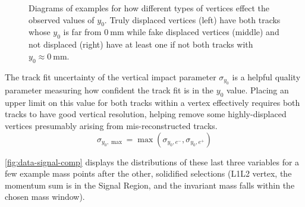 \begin{figure}
  \begin{subfigure}{0.32\textwidth}
    \resizebox{\textwidth}{!}{}
  \end{subfigure}
  \begin{subfigure}{0.32\textwidth}
    \resizebox{\textwidth}{!}{}
  \end{subfigure}
  \begin{subfigure}{0.32\textwidth}
    \resizebox{\textwidth}{!}{}
  \end{subfigure}
  \caption{Diagrams of examples for how different types of vertices effect the observed
  values of $y_0$. Truly displaced vertices (left) have both tracks whose $y_0$ is far
  from $\qty{0}{\mm}$ while fake displaced vertices (middle) and not displaced (right)
  have at least one if not both tracks with $y_0\approx\qty{0}{\mm}$.}
  \label{fig:hps-displace-eg}
\end{figure}

The track fit uncertainty of the vertical impact parameter $\sigma_{y_0}$
is a helpful quality parameter measuring how confident the track fit is
in the $y_0$ value.
Placing an upper limit on this value for both tracks within a vertex
effectively requires both tracks to have good vertical resolution,
helping remove some highly-displaced vertices presumably arising
from mis-reconstructed tracks.
\begin{equation}
  \sigma_{y_0,\max} = \max(\sigma_{y_0,e^-},\sigma_{y_0,e^+})
\end{equation}

\cref{fig:data-signal-comp} displays the distributions of these last three
variables for a few example mass points after the other, solidified selections
(L1L2 vertex, the momentum sum is in the Signal Region, and the invariant mass
falls within the chosen mass window).

